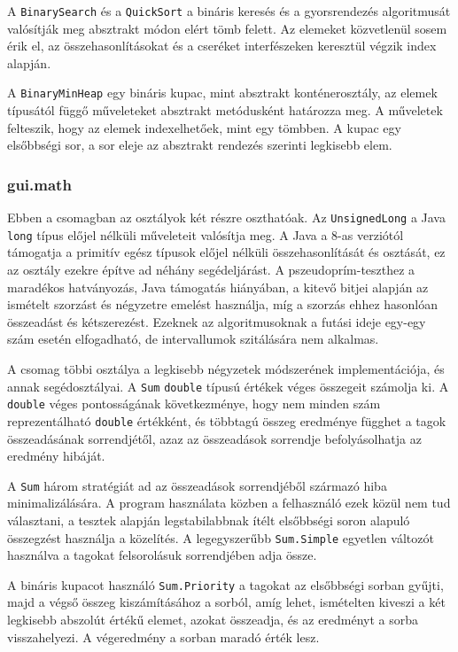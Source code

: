 A \texttt{BinarySearch} és a \texttt{QuickSort} a bináris keresés és a gyorsrendezés algoritmusát valósítják meg absztrakt módon elért tömb felett.
Az elemeket közvetlenül sosem érik el, az összehasonlításokat és a cseréket interfészeken keresztül végzik index alapján.

A \texttt{BinaryMinHeap} egy bináris kupac, mint absztrakt konténerosztály, az elemek típusától függő műveleteket absztrakt metódusként határozza meg.
A műveletek felteszik, hogy az elemek indexelhetőek, mint egy tömbben.
A kupac egy elsőbbségi sor, a sor eleje az absztrakt rendezés szerinti legkisebb elem.

\subsubsection{gui.math}

Ebben a csomagban az osztályok két részre oszthatóak.
Az \texttt{UnsignedLong} a Java \texttt{long} típus előjel nélküli műveleteit valósítja meg.
A Java a 8-as verziótól támogatja a primitív egész típusok előjel nélküli összehasonlítását és osztását, ez az osztály ezekre építve ad néhány segédeljárást.
A pszeudoprím-teszthez a maradékos hatványozás, Java támogatás hiányában, a kitevő bitjei alapján az ismételt szorzást és négyzetre emelést használja, míg a szorzás ehhez hasonlóan összeadást és kétszerezést.
Ezeknek az algoritmusoknak a futási ideje egy-egy szám esetén elfogadható, de intervallumok szitálására nem alkalmas.

A csomag többi osztálya a legkisebb négyzetek módszerének implementációja, és annak segédosztályai.
A \texttt{Sum} \texttt{double} típusú értékek véges összegeit számolja ki.
A \texttt{double} véges pontosságának következménye, hogy nem minden szám reprezentálható \texttt{double} értékként, és többtagú összeg eredménye függhet a tagok összeadásának sorrendjétől, azaz az összeadások sorrendje befolyásolhatja az eredmény hibáját.

A \texttt{Sum} három stratégiát ad az összeadások sorrendjéből származó hiba minimalizálására.
A program használata közben a felhasználó ezek közül nem tud választani, a tesztek alapján legstabilabbnak ítélt elsőbbségi soron alapuló összegzést használja a közelítés.
A legegyszerűbb \texttt{Sum.Simple} egyetlen változót használva a tagokat felsorolásuk sorrendjében adja össze.

A bináris kupacot használó \texttt{Sum.Priority} a tagokat az elsőbbségi sorban gyűjti, majd a végső összeg kiszámításához a sorból, amíg lehet, ismételten kiveszi a két legkisebb abszolút értékű elemet, azokat összeadja, és az eredményt a sorba visszahelyezi.
A végeredmény a sorban maradó érték lesz.

